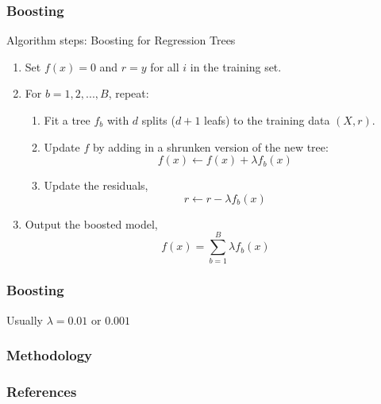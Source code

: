 \documentclass{beamer}
\begin{document}
\begin{frame}
\frametitle{Boosting}

Algorithm steps: Boosting for Regression Trees

\begin{enumerate}
\item  Set $f(x) = 0$ and $r = y$ for all $i$ in the training set.
\item For $b = 1,2,...,B$, repeat: 
\begin{enumerate}
\item Fit a tree $f_b$ with $d$ splits ($d+1$ leafs) to the training data $(X,r)$.
\item Update $f$ by adding in a shrunken version of the new tree: 
$$  f(x) \leftarrow f(x) + \lambda f_b(x) $$
\item Update the residuals,
$$ r \leftarrow r  - \lambda f_b (x) $$
\end{enumerate}
\item  Output the boosted model, 
$$ f(x) = \sum\limits_{b=1}^{B}  \lambda f_b (x) $$
\end{enumerate}

\end{frame} 



\begin{frame}
\frametitle{Boosting}

Usually $\lambda = 0.01 \text{ or } 0.001$





\end{frame} 





\begin{frame}
\frametitle{Methodology}







\end{frame} 









\begin{frame}
\frametitle{References}
\begin{tiny}

\end{tiny}
\end{frame} 
\end{document}
